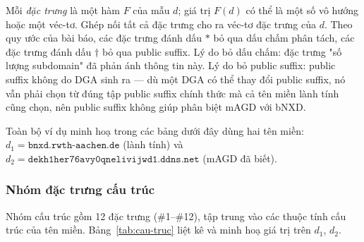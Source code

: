 Mỗi \textit{đặc trưng} là một hàm $F$ của mẫu $d$; giá trị $F(d)$ có thể là một số vô hướng hoặc một véc-tơ. Ghép nối tất cả đặc trưng cho ra véc-tơ đặc trưng của $d$. Theo quy ước của bài báo, các đặc trưng đánh dấu $*$ bỏ qua dấu chấm phân tách, các đặc trưng đánh dấu $\dagger$ bỏ qua public suffix. Lý do bỏ dấu chấm: đặc trưng "số lượng subdomain" đã phản ánh thông tin này. Lý do bỏ public suffix: public suffix không do DGA sinh ra --- dù một DGA có thể thay đổi public suffix, nó vẫn phải chọn từ đúng tập public suffix chính thức mà cả tên miền lành tính cũng chọn, nên public suffix không giúp phân biệt mAGD với bNXD.

Toàn bộ ví dụ minh hoạ trong các bảng dưới đây dùng hai tên miền: $d_1 = \texttt{bnxd.rwth-aachen.de}$ (lành tính) và $d_2 = \texttt{dekh1her76avy0qnelivijwd1.ddns.net}$ (mAGD đã biết).

\subsubsection{Nhóm đặc trưng cấu trúc}

Nhóm cấu trúc gồm 12 đặc trưng (\#1--\#12), tập trung vào các thuộc tính cấu trúc của tên miền. Bảng~\ref{tab:cau-truc} liệt kê và minh hoạ giá trị trên $d_1$, $d_2$.

